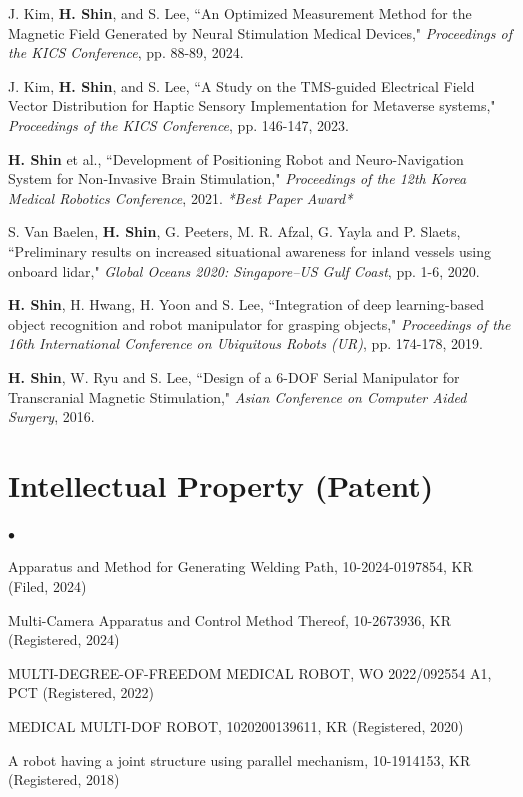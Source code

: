 \documentclass[margin,line]{res}
\newenvironment{list2}{
  \begin{list}{$\bullet$}{%
      \setlength{\itemsep}{0.05in}
      \setlength{\parsep}{0in} \setlength{\parskip}{0in}
      \setlength{\topsep}{0in} \setlength{\partopsep}{0in} 
      \setlength{\leftmargin}{0.2in}}}{\end{list}}
\begin{document}
\begin{resume}
J. Kim, \textbf{H. Shin}, and S. Lee, ``An Optimized Measurement Method for the Magnetic Field Generated by Neural Stimulation Medical Devices," \textit{Proceedings of the KICS Conference}, pp. 88-89, 2024.

J. Kim, \textbf{H. Shin}, and S. Lee, ``A Study on the TMS-guided Electrical Field Vector Distribution for Haptic Sensory Implementation for Metaverse systems," \textit{Proceedings of the KICS Conference}, pp. 146-147, 2023.

\textbf{H. Shin} et al., ``Development of Positioning Robot and Neuro-Navigation System for Non-Invasive Brain Stimulation," \textit{Proceedings of the 12th Korea Medical Robotics Conference}, 2021. \textit{*Best Paper Award*}

S. Van Baelen, \textbf{H. Shin}, G. Peeters, M. R. Afzal, G. Yayla and P. Slaets, ``Preliminary results on increased situational awareness for inland vessels using onboard lidar," \textit{Global Oceans 2020: Singapore–US Gulf Coast}, pp. 1-6, 2020.

\textbf{H. Shin}, H. Hwang, H. Yoon and S. Lee, ``Integration of deep learning-based object recognition and robot manipulator for grasping objects," \textit{Proceedings of the 16th International Conference on Ubiquitous Robots (UR)}, pp. 174-178, 2019.

\textbf{H. Shin}, W. Ryu and S. Lee, ``Design of a 6-DOF Serial Manipulator for Transcranial Magnetic Stimulation," \textit{Asian Conference on Computer Aided Surgery}, 2016.


\vspace{.1in} %

\section{\sc Intellectual Property (Patent)}
\begin{list2}
\item Apparatus and Method for Generating Welding Path, 10-2024-0197854, KR (Filed, 2024)
\item Multi-Camera Apparatus and Control Method Thereof, 10-2673936, KR (Registered, 2024)
\item MULTI-DEGREE-OF-FREEDOM MEDICAL ROBOT, WO 2022/092554 A1, PCT (Registered, 2022)
\item MEDICAL MULTI-DOF ROBOT, 1020200139611, KR (Registered, 2020)
\item A robot having a joint structure using parallel mechanism, 10-1914153, KR (Registered, 2018)
\end{list2}



\end{resume}
\end{document}
